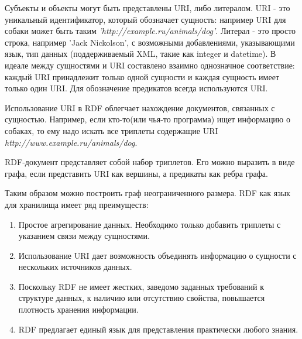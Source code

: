 \documentclass[specialist,subf,href,colorlinks=true
]{disser}
\begin{document}
Субъекты и объекты могут быть представлены URI, либо литералом. URI - это уникальный идентификатор, который обозначает сущность: например URI для собаки может быть таким \textit{'http://example.ru/animals/dog'}. Литерал - это просто строка, например 'Jack Nickolson', с возможными добавлениями, указывающими язык, тип данных (поддерживаемый XML, такие как integer и datetime). В идеале между сущностями и URI составлено взаимно однозначное соответствие: каждый URI принадлежит только одной сущности и каждая сущность имеет только один URI.
Для обозначение предикатов всегда используются URI.

Использование URI в RDF облегчает нахождение документов, связанных с сущностью. Например, если кто-то(или чья-то программа) ищет информацию о собаках, то ему надо искать все триплеты содержащие URI \textit{http://www.example.ru/animals/dog}.

RDF-документ представляет собой набор триплетов. Его можно выразить в виде графа, если представить URI как вершины, а предикаты как ребра графа.

\par {}

Таким образом можно построить граф неограниченного размера.
RDF как язык для хранилища имеет ряд преимуществ:
\begin{enumerate}
\item Простое агрегирование данных. Необходимо только добавить триплеты с указанием связи между сущностями.
\item Использование URI дает возможность объединять информацию о сущности с нескольких источников данных.
\item Поскольку RDF не имеет жестких, заведомо заданных требований к структуре данных, к наличию или отсутствию свойства, повышается плотность хранения информации.
\item RDF предлагает единый язык для представления практически любого знания.
\end{enumerate}
\end{document}
